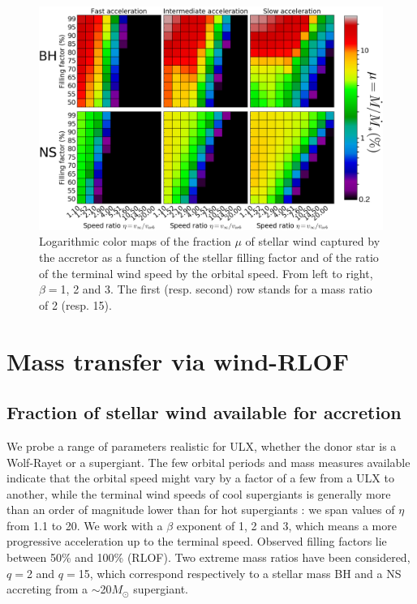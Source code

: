 \documentclass[letter]{aa}
\makeatletter
\newcommand{\ulx}{ULX\xspace}
\newcommand*{\rlof}{RLOF\@\xspace}
\newcommand*{\ns}{NS\@\xspace}
\newcommand*{\bh}{BH\@\xspace}
\newcommand*{\msun}{$M_{\odot}$\@\xspace}
\makeatother
\begin{document}
\begin{figure}[!b]
\centering
\includegraphics[width=2\columnwidth]{Pictures/mdot_grid.png}
\caption{Logarithmic color maps of the fraction $\mu$ of stellar wind captured by the accretor as a function of the stellar filling factor and of the ratio of the terminal wind speed by the orbital speed. From left to right, $\beta=$1, 2 and 3. The first (resp. second) row stands for a mass ratio of 2 (resp. 15).}
\label{fig:mdot}
\end{figure} 

\section{Mass transfer via wind-RLOF}
\label{sec:}

\subsection{Fraction of stellar wind available for accretion}
\label{sec:}

We probe a range of parameters realistic for \ulx, whether the donor star is a Wolf-Rayet or a supergiant. The few orbital periods and mass measures available indicate that the orbital speed might vary by a factor of a few from a \ulx to another, while the terminal wind speeds of cool supergiants is generally more than an order of magnitude lower than for hot supergiants : we span values of $\eta$ from 1.1 to 20. We work with a $\beta$ exponent of 1, 2 and 3, which means a more progressive acceleration up to the terminal speed. Observed filling factors lie between 50\% and 100\% (\rlof). Two extreme mass ratios have been considered, $q=$2 and $q=$15, which correspond respectively to a stellar mass \bh and a \ns accreting from a $\sim$20\msun supergiant.
\end{document}
